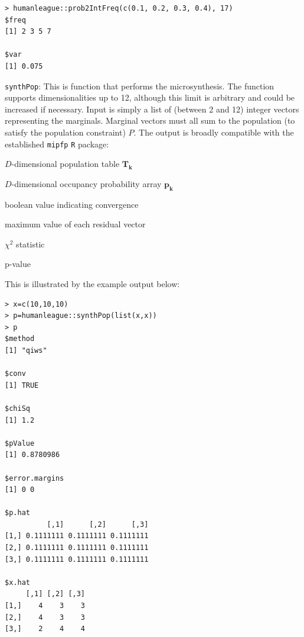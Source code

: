 \documentclass{JASSS}
\newenvironment{Shaded}{\begin{snugshade}}{\end{snugshade}}
\begin{document}
\begin{Shaded}
\begin{verbatim}
> humanleague::prob2IntFreq(c(0.1, 0.2, 0.3, 0.4), 17)
$freq
[1] 2 3 5 7

$var
[1] 0.075
\end{verbatim}
\end{Shaded}

\texttt{synthPop}: This is function that performs the microsynthesis. The function supports dimensionalities up to 12, although this
limit is arbitrary and could be increased if necessary. Input is simply
a list of (between 2 and 12) integer vectors representing the marginals. Marginal vectors
must all sum to the population (to satisfy the population constraint) \(P\).
The output is broadly compatible with the established \texttt{mipfp}
\citep{barthelemy_cran_2016} \texttt{R} package:
\begin{itemize*}
\item
  \(D\)-dimensional population table \(\mathbf{T_\mathbf{k}}\)
\item
  \(D\)-dimensional occupancy probability array
  \(\mathbf{p_\mathbf{k}}\)
\item
  boolean value indicating convergence
\item
  maximum value of each residual vector
\item
  \(\chi^2\) statistic
\item
  p-value
\end{itemize*} 

This is illustrated by the example output below:

\begin{Shaded}
\begin{verbatim}
> x=c(10,10,10)
> p=humanleague::synthPop(list(x,x))
> p
$method
[1] "qiws"

$conv
[1] TRUE

$chiSq
[1] 1.2

$pValue
[1] 0.8780986

$error.margins
[1] 0 0

$p.hat
          [,1]      [,2]      [,3]
[1,] 0.1111111 0.1111111 0.1111111
[2,] 0.1111111 0.1111111 0.1111111
[3,] 0.1111111 0.1111111 0.1111111

$x.hat
     [,1] [,2] [,3]
[1,]    4    3    3
[2,]    4    3    3
[3,]    2    4    4
\end{verbatim}
\end{Shaded}
\end{document}
